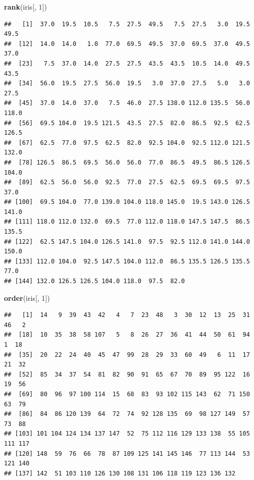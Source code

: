 \documentclass[]{book}
\newenvironment{Shaded}{\begin{snugshade}}{\end{snugshade}}
\newcommand{\KeywordTok}[1]{\textcolor[rgb]{0.13,0.29,0.53}{\textbf{#1}}}
\newcommand{\DecValTok}[1]{\textcolor[rgb]{0.00,0.00,0.81}{#1}}
\newcommand{\NormalTok}[1]{#1}
\begin{document}
\begin{Shaded}
\begin{Highlighting}[]
\KeywordTok{rank}\NormalTok{(iris[, }\DecValTok{1}\NormalTok{])}
\end{Highlighting}
\end{Shaded}

\begin{verbatim}
##   [1]  37.0  19.5  10.5   7.5  27.5  49.5   7.5  27.5   3.0  19.5  49.5
##  [12]  14.0  14.0   1.0  77.0  69.5  49.5  37.0  69.5  37.0  49.5  37.0
##  [23]   7.5  37.0  14.0  27.5  27.5  43.5  43.5  10.5  14.0  49.5  43.5
##  [34]  56.0  19.5  27.5  56.0  19.5   3.0  37.0  27.5   5.0   3.0  27.5
##  [45]  37.0  14.0  37.0   7.5  46.0  27.5 138.0 112.0 135.5  56.0 118.0
##  [56]  69.5 104.0  19.5 121.5  43.5  27.5  82.0  86.5  92.5  62.5 126.5
##  [67]  62.5  77.0  97.5  62.5  82.0  92.5 104.0  92.5 112.0 121.5 132.0
##  [78] 126.5  86.5  69.5  56.0  56.0  77.0  86.5  49.5  86.5 126.5 104.0
##  [89]  62.5  56.0  56.0  92.5  77.0  27.5  62.5  69.5  69.5  97.5  37.0
## [100]  69.5 104.0  77.0 139.0 104.0 118.0 145.0  19.5 143.0 126.5 141.0
## [111] 118.0 112.0 132.0  69.5  77.0 112.0 118.0 147.5 147.5  86.5 135.5
## [122]  62.5 147.5 104.0 126.5 141.0  97.5  92.5 112.0 141.0 144.0 150.0
## [133] 112.0 104.0  92.5 147.5 104.0 112.0  86.5 135.5 126.5 135.5  77.0
## [144] 132.0 126.5 126.5 104.0 118.0  97.5  82.0
\end{verbatim}

\begin{Shaded}
\begin{Highlighting}[]
\KeywordTok{order}\NormalTok{(iris[, }\DecValTok{1}\NormalTok{])}
\end{Highlighting}
\end{Shaded}

\begin{verbatim}
##   [1]  14   9  39  43  42   4   7  23  48   3  30  12  13  25  31  46   2
##  [18]  10  35  38  58 107   5   8  26  27  36  41  44  50  61  94   1  18
##  [35]  20  22  24  40  45  47  99  28  29  33  60  49   6  11  17  21  32
##  [52]  85  34  37  54  81  82  90  91  65  67  70  89  95 122  16  19  56
##  [69]  80  96  97 100 114  15  68  83  93 102 115 143  62  71 150  63  79
##  [86]  84  86 120 139  64  72  74  92 128 135  69  98 127 149  57  73  88
## [103] 101 104 124 134 137 147  52  75 112 116 129 133 138  55 105 111 117
## [120] 148  59  76  66  78  87 109 125 141 145 146  77 113 144  53 121 140
## [137] 142  51 103 110 126 130 108 131 106 118 119 123 136 132
\end{verbatim}
\end{document}
